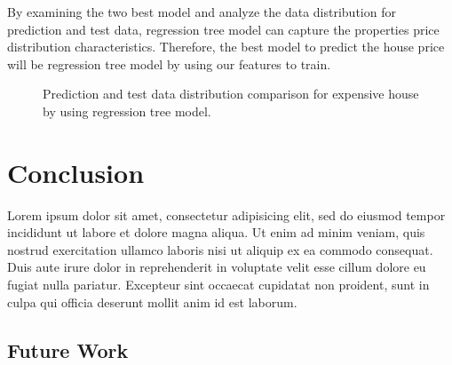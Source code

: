 \documentclass[11pt,a4paper]{article}
\begin{document}
\FloatBarrier
By examining the two best model and analyze the data distribution for prediction and test data, regression tree model can capture the properties price distribution characteristics. Therefore, the best model to predict the house price will be regression tree model by using our features to train.
\FloatBarrier
\begin{figure}[h]
    \centering
    \hfill%
    \caption{Prediction and test data distribution comparison for expensive house by using regression tree model.}
    \label{fig:regtreemexpensive}
\end{figure}



\FloatBarrier



\section{Conclusion}

Lorem ipsum dolor sit amet, consectetur adipisicing elit, sed do eiusmod
tempor incididunt ut labore et dolore magna aliqua. Ut enim ad minim veniam,
quis nostrud exercitation ullamco laboris nisi ut aliquip ex ea commodo
consequat. Duis aute irure dolor in reprehenderit in voluptate velit esse
cillum dolore eu fugiat nulla pariatur. Excepteur sint occaecat cupidatat non
proident, sunt in culpa qui officia deserunt mollit anim id est laborum.

\subsection{Future Work}




\end{document}
